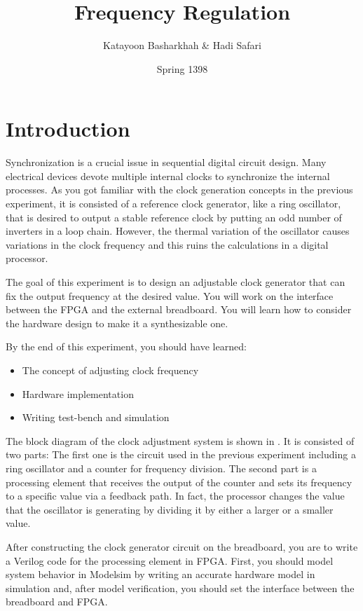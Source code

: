 \documentclass[12pt, logo=tehranDLDL/ut]{tehranDLDL}
\title{Frequency Regulation}
\author{Katayoon Basharkhah \& Hadi Safari}
\date{Spring 1398}
\begin{document}
\maketitle

\tableofcontents
\newpage

\section*{Introduction}

Synchronization is a crucial issue in sequential digital circuit design. Many electrical devices devote multiple internal clocks to synchronize the internal processes. As you got familiar with the clock generation concepts in the previous experiment, it is consisted of a reference clock generator, like a ring oscillator, that is desired to output a stable reference clock by putting an odd number of inverters in a loop chain. However, the thermal variation of the oscillator causes variations in the clock frequency and this ruins the calculations in a digital processor.

The goal of this experiment is to design an adjustable clock generator that can fix the output frequency at the desired value. You will work on the interface between the FPGA and the external breadboard. You will learn how to consider the hardware design to make it a synthesizable one.

By the end of this experiment, you should have learned:
\begin{itemize}
    \item The concept of adjusting clock frequency
    \item Hardware implementation 
    \item Writing test-bench and simulation
\end{itemize}

The block diagram of the clock adjustment system is shown in . It is consisted of two parts:
The first one is the circuit used in the previous experiment including a ring oscillator and a counter for frequency division.
The second part is a processing element that receives the output of the counter and sets its frequency to a specific value via a feedback path.
In fact, the processor changes the value that the oscillator is generating by dividing it by either a larger or a smaller value.

After constructing the clock generator circuit on the breadboard, you are to write a Verilog code for the processing element in FPGA.
First, you should model system behavior in Modelsim by writing an accurate hardware model in simulation and, after model verification, you should set the interface between the breadboard and FPGA.
\end{document}
